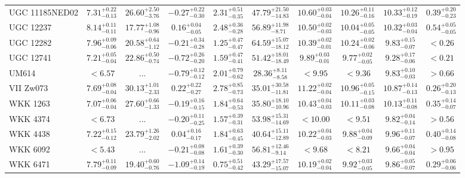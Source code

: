 \documentclass[onecolumn]{mn2e}
\begin{document}
\begin{landscape}
{\begin{center}
\begin{longtable}{lccccccccc}
UGC 11185NED02 & $7.31_{-0.13}^{+0.22}$ & $26.60_{-3.76}^{+2.50}$ & $-0.27_{-0.30}^{+0.22}$ & $2.31_{-0.35}^{+0.51}$ &$47.79_{-14.83}^{+21.50}$ & $10.60_{-0.04}^{+0.03}$ & $10.26_{-0.16}^{+0.11}$ & $10.33_{-0.19}^{+0.12}$ & $0.39_{-0.23}^{+0.20}$ \\
UGC 12237 & $8.14_{-0.11}^{+0.11}$ & $17.77_{-0.96}^{+1.08}$ & $0.16_{-0.05}^{+0.04}$ & $2.48_{-0.28}^{+0.36}$ &$56.89_{-8.71}^{+11.98}$ & $10.50_{-0.03}^{+0.02}$ & $10.04_{-0.05}^{+0.05}$ & $10.32_{-0.04}^{+0.03}$ & $0.54_{-0.05}^{+0.05}$ \\
UGC 12282 & $7.96_{-0.06}^{+0.09}$ & $20.58_{-1.12}^{+0.64}$ & $-0.21_{-0.28}^{+0.34}$ & $1.25_{-0.47}^{+0.47}$ &$64.59_{-18.12}^{+15.07}$ & $10.39_{-0.01}^{+0.02}$ & $10.24_{-0.06}^{+0.02}$ & $9.83_{-0.07}^{+0.15}$ & $<0.26$ \\
UGC 12741 & $7.21_{-0.04}^{+0.05}$ & $22.86_{-0.74}^{+0.50}$ & $-0.72_{-0.20}^{+0.26}$ & $1.59_{-0.41}^{+0.47}$ &$51.42_{-18.49}^{+18.01}$ & $9.89_{-0.01}^{+0.03}$ & $9.77_{-0.05}^{+0.02}$ & $9.28_{-0.06}^{+0.17}$ & $<0.21$ \\
UM614 & $<6.57$ & ... & $-0.79_{-0.12}^{+0.12}$ & $2.01_{-0.62}^{+0.79}$ &$28.36_{-8.58}^{+8.11}$ & $<9.95$ & $<9.36$ & $9.83_{-0.03}^{+0.10}$ & $>0.66$ \\
VII Zw073 & $7.69_{-0.04}^{+0.08}$ & $30.13_{-2.33}^{+1.01}$ & $0.22_{-0.27}^{+0.22}$ & $2.78_{-0.73}^{+0.85}$ &$35.01_{-11.81}^{+30.58}$ & $11.22_{-0.04}^{+0.02}$ & $10.96_{-0.15}^{+0.05}$ & $10.87_{-0.13}^{+0.14}$ & $0.26_{-0.13}^{+0.20}$ \\
WKK 1263 & $7.07_{-0.04}^{+0.06}$ & $27.60_{-1.33}^{+0.66}$ & $-0.19_{-0.15}^{+0.16}$ & $1.84_{-0.53}^{+0.64}$ &$35.80_{-10.96}^{+18.10}$ & $10.43_{-0.03}^{+0.04}$ & $10.11_{-0.08}^{+0.03}$ & $10.13_{-0.08}^{+0.11}$ & $0.35_{-0.07}^{+0.14}$ \\
WKK 4374 & $<6.73$ & ... & $-0.20_{-0.25}^{+0.11}$ & $1.57_{-0.31}^{+0.39}$ &$53.98_{-14.69}^{+15.31}$ & $<10.00$ & $<9.51$ & $9.82_{-0.14}^{+0.04}$ & $>0.56$ \\
WKK 4438 & $7.22_{-0.12}^{+0.15}$ & $23.79_{-2.02}^{+1.26}$ & $0.04_{-0.17}^{+0.16}$ & $1.84_{-0.45}^{+0.63}$ &$40.64_{-12.89}^{+15.11}$ & $10.22_{-0.03}^{+0.04}$ & $9.88_{-0.09}^{+0.04}$ & $9.96_{-0.07}^{+0.11}$ & $0.40_{-0.08}^{+0.14}$ \\
WKK 6092 & $<5.43$ & ... & $-0.21_{-0.08}^{+0.08}$ & $1.61_{-0.30}^{+0.39}$ &$56.81_{-9.14}^{+12.46}$ & $<9.68$ & $<8.21$ & $9.66_{-0.04}^{+0.04}$ & $>0.95$ \\
WKK 6471 & $7.79_{-0.09}^{+0.11}$ & $19.40_{-0.76}^{+0.60}$ & $-1.09_{-0.19}^{+0.14}$ & $0.75_{-0.42}^{+0.51}$ &$43.29_{-15.07}^{+17.57}$ & $10.19_{-0.04}^{+0.02}$ & $9.92_{-0.05}^{+0.03}$ & $9.86_{-0.07}^{+0.05}$ & $0.29_{-0.06}^{+0.06}$ \\
\end{longtable}
\end{center}
}
\end{landscape}
\end{document}
